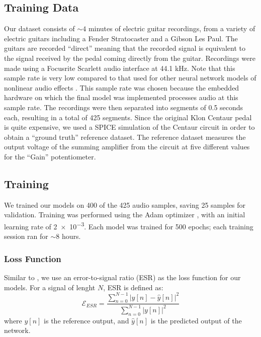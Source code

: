 \documentclass[twoside,a4paper]{article}
\begin{document}
\subsection{Training Data}
Our dataset consists of $\sim 4$ minutes of electric guitar recordings,
from a variety of electric guitars including a Fender Stratocaster
and a Gibson Les Paul. The guitars are recorded ``direct'' meaning
that the recorded signal is equivalent to the signal received by the
pedal coming directly from the guitar. Recordings were made using a
Focusrite Scarlett audio interface at 44.1 kHz. Note that this
sample rate is very low compared to that used for other neural network
models of nonlinear audio effects \cite{WaveNetVA,VArnn}. This sample
rate was chosen because the embedded hardware on which the final model
was implemented processes audio at this sample rate. The recordings
were then separated into segments of 0.5 seconds each, resulting in a
total of 425 segments.
\newline\newline
Since the original Klon Centaur pedal is quite expensive, we used a SPICE
simulation of the Centaur circuit in order to obtain a ``ground truth''
reference dataset. The reference dataset measures the output voltage
of the summing amplifier from the circuit at five different values
for the ``Gain'' potentiometer.

\subsection{Training}
We trained our models on 400 of the 425 audio samples, saving 25
samples for validation. Training was performed using the Adam
optimizer \cite{Kingma2015AdamAM}, with an initial learning rate
of \num{2e-3}. Each model was trained for 500 epochs; each training
session ran for $\sim 8$ hours.

\subsubsection{Loss Function}
Similar to \cite{VArnn}, we use an error-to-signal ratio (ESR) as the
loss function for our models. For a signal of lenght $N$, ESR is defined as:
\begin{equation}
    \mathcal{E}_{ESR} = \frac{\sum_{n=0}^{N-1} |y[n] - \hat{y}[n]|^2}{\sum_{n=0}^{N-1} |y[n]|^2}
\end{equation}
%
where $y[n]$ is the reference output, and $\hat{y}[n]$ is the predicted
output of the network.
\end{document}
